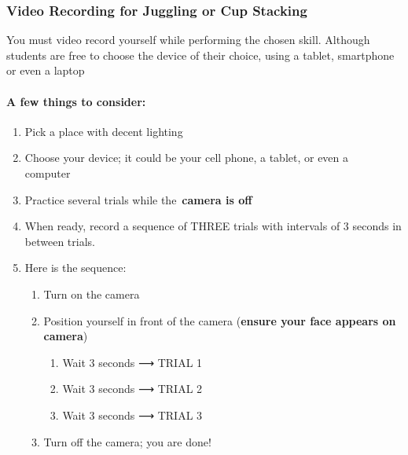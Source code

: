 \documentclass[
  letterpaper,
  DIV=11,
  numbers=noendperiod]{scrartcl}
\let\oldparagraph\paragraph
\renewcommand{\paragraph}[1]{\oldparagraph{#1}\mbox{}}
\providecommand{\tightlist}{%
  \setlength{\itemsep}{0pt}\setlength{\parskip}{0pt}}\usepackage{longtable,booktabs,array}
\begin{document}
\hypertarget{video-recording-for-juggling-or-cup-stacking}{%
\subsubsection{\texorpdfstring{Video Recording for \textbf{Juggling or
Cup
Stacking}}{Video Recording for Juggling or Cup Stacking}}\label{video-recording-for-juggling-or-cup-stacking}}

You must video record yourself while performing the chosen skill.
Although students are free to choose the device of their choice, using a
tablet, smartphone or even a laptop

\hypertarget{a-few-things-to-consider}{%
\paragraph{A few things to consider:}\label{a-few-things-to-consider}}

\begin{enumerate}
\def\labelenumi{\arabic{enumi}.}
\tightlist
\item
  Pick a place with decent lighting
\item
  Choose your device; it could be your cell phone, a tablet, or even a
  computer~
\item
  Practice several trials while the~\textbf{camera is off}
\item
  When ready, record a sequence of THREE trials with intervals of 3
  seconds in between trials.
\item
  Here is the sequence:

  \begin{enumerate}
  \def\labelenumii{\arabic{enumii}.}
  \tightlist
  \item
    Turn on the camera
  \item
    Position yourself in front of the camera (\textbf{ensure your face
    appears on camera})

    \begin{enumerate}
    \def\labelenumiii{\arabic{enumiii}.}
    \tightlist
    \item
      Wait 3 seconds ⟶ TRIAL 1~
    \item
      Wait 3 seconds ⟶ TRIAL 2
    \item
      Wait 3 seconds ⟶ TRIAL 3
    \end{enumerate}
  \item
    Turn off the camera; you are done!
  \end{enumerate}
\end{enumerate}
\end{document}
